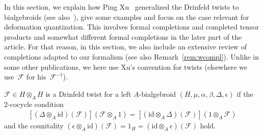 \documentclass[pdftex]{sigma}
\numberwithin{equation}{section}
\begin{document}
In this section, we explain how Ping Xu~\cite{xu} generalized the Drinfeld twists to bialgebroids (see also~\cite{doninmudrov}), give some examples and focus on the case relevant for deformation quantization. This involves formal completions and completed tensor products and somewhat different formal completions in the later part of the article. For that reason, in this section, we also include an extensive review of completions adapted to our formalism (see also Remark~\ref{rem:wcompl}). Unlike in some other publications, we here use Xu's convention for twists (elsewhere we use~$\mathcal{F}$ for his~$\mathcal{F}^{-1}$).

\begin{Definition}[\cite{xu}]
$\mathcal{F}\in H\otimes_A H$ is a Drinfeld twist for a left $A$-bialgebroid
$(H,\mu,\alpha,\beta,\Delta,\epsilon)$
if the 2-cocycle condition
\begin{gather}\label{eq:2coc}
[(\Delta\otimes_A \mathrm{id})(\mathcal{F})](\mathcal{F}\otimes_A 1)
=
[(\mathrm{id}\otimes_A\Delta)(\mathcal{F})](1\otimes_A\mathcal{F})
\end{gather}
and the counitality $(\epsilon\otimes_A\mathrm{id})(\mathcal{F}) = 1_H
= (\mathrm{id}\otimes_A\epsilon)(\mathcal{F})$ hold.
\end{Definition}
\end{document}
